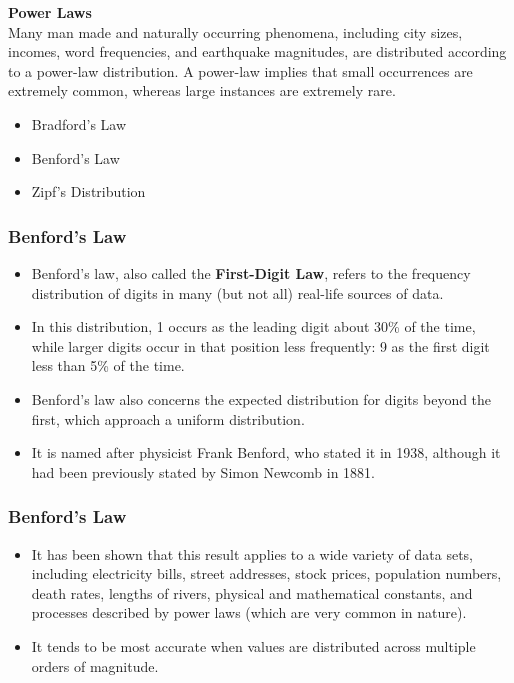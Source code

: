 \documentclass[MAIN.tex]{subfiles}
\begin{document}
 
\begin{frame}
\large
\textbf{Power Laws}\\
Many man made and naturally occurring phenomena, including city sizes, incomes, word frequencies, and earthquake magnitudes, are distributed according to a power-law distribution. A power-law implies that small occurrences are extremely common, whereas large instances are extremely rare. 
	\begin{itemize}
		\item Bradford's Law 
		\item Benford's Law
		\item Zipf's Distribution
	\end{itemize}
\end{frame}
\begin{frame}
	\frametitle{Benford's Law}
	\large
\begin{itemize}
\item Benford's law, also called the \textbf{First-Digit Law}, refers to the frequency distribution of digits in many (but not all) real-life sources of data. 
\item In this distribution, 1 occurs as the leading digit about 30\% of the time, while larger digits occur in that position less frequently: 9 as the first digit less than 5\% of the time. 
\item Benford's law also concerns the expected distribution for digits beyond the first, which approach a uniform distribution.
\item It is named after physicist Frank Benford, who stated it in 1938, although it had been previously stated by Simon Newcomb in 1881.
\end{itemize}
\end{frame}
\begin{frame}
	\frametitle{Benford's Law}
	\large
\begin{itemize}
\item It has been shown that this result applies to a wide variety of data sets, including electricity bills, street addresses, stock prices, population numbers, death rates, lengths of rivers, physical and mathematical constants, and processes described by power laws (which are very common in nature). \item It tends to be most accurate when values are distributed across multiple orders of magnitude.
\end{itemize}
\end{frame}
\end{document}
